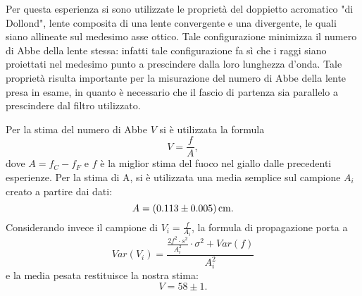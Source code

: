 
Per questa esperienza si sono utilizzate le propriet\`a del doppietto acromatico "di Dollond", lente composita di una lente convergente e una divergente, le quali siano allineate sul medesimo asse ottico. Tale configurazione minimizza il numero di Abbe della lente stessa: infatti tale configurazione fa s\`i che i raggi siano proiettati nel medesimo punto a prescindere dalla loro lunghezza d'onda. Tale propriet\`a risulta importante per la misurazione del numero di Abbe della lente presa in esame, in quanto \`e necessario che il fascio di partenza sia parallelo a prescindere dal filtro utilizzato.

Per la stima del numero di Abbe $V$ si \`e utilizzata la formula
\[ V=\frac{f}{A} ,\]
dove \(A= f_C - f_F\) e $f$ \`e la miglior stima del fuoco nel giallo dalle precedenti esperienze. %
Per la stima di A, si \`e utilizzata una media semplice sul campione ${A_i}$ creato a partire dai dati:
\[ A = (0.113 \pm 0.005) \,\mathrm{cm} .\]
Considerando invece il campione di \( V_i=\frac{f}{A_i} \), la formula di propagazione porta a 
\[ Var(V_i) = \frac{
\frac{2f^2 \cdot s^2}{A_i^2} \cdot \sigma^2 + Var(f)
}{A_i^2} \]
e la media pesata restituisce la nostra stima:
\[V= 58 \pm 1 .\]


